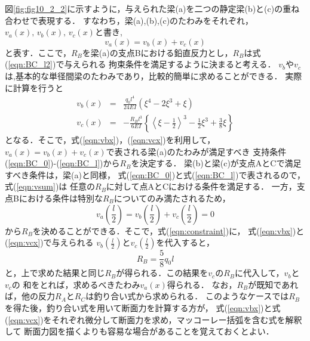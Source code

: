 \documentclass[10pt,a4j]{jbook}
\begin{document}
\begin{enumerate}
図\ref{fig:fig10_2_2}に示すように，与えられた梁(a)を二つの静定梁(b)と(c)の重ね合わせで表現する．
すなわち，梁(a),(b),(c)のたわみをそれぞれ，$v_a(x),\,v_b(x),\,v_c(x)$と書き,
\begin{equation}
	v_a(x)=v_b(x)+v_c(x)
	\label{eqn:v_sum}
\end{equation}
と表す．ここで，$R_B$を梁(a)の支点Bにおける鉛直反力とし，$R_B$は式(\ref{eqn:BC_l2})で与えられる
拘束条件を満足するように決まると考える． 
$v_b$や$v_c$は,基本的な単径間梁のたわみであり，比較的簡単に求めることができる．
実際に計算を行うと
\begin{eqnarray}
	v_b(x)&= & 
		\frac{q_0l^4}{24EI} \left( \xi^4-2\xi^3 +\xi \right)
	\label{eqn:vbx}
	\\
	v_c(x)&= & 
		-\frac{R_Bl^3}{6EI} \left\{ \left< \xi-\frac{1}{2}\right>^3 
		-\frac{1}{2}\xi^3 +\frac{3}{8}\xi \right\}
	\label{eqn:vcx}
\end{eqnarray}
となる．そこで，式(\ref{eqn:vbx})，(\ref{eqn:vcx})を利用して，
$v_a(x)=v_b(x)+v_c(x)$で表される梁(a)のたわみが満足すべき
支持条件(\ref{eqn:BC_0})-(\ref{eqn:BC_l})から$R_B$を決定する．
梁(b)と梁(c)が支点AとCで満足すべき条件は，梁(a)と同様，
式(\ref{eqn:BC_0})と式(\ref{eqn:BC_l})で表されるので，式(\ref{eqn:vsum})は
任意の$R_B$に対して点AとCにおける条件を満足する．
一方，支点Bにおける条件は特別な$R_B$についてのみ満たされるため，
\begin{equation}
	v_a\left(\frac{l}{2}\right)
	=
	v_b\left(\frac{l}{2}\right)
	+
	v_c\left(\frac{l}{2}\right)
	=0
	\label{eqn:constraint}
\end{equation}
から$R_B$を決めることができる．そこで，式(\ref{eqn:constraint})に，
式(\ref{eqn:vbx})と(\ref{eqn:vcx})で与えられる
$v_b\left(\frac{l}{2}\right)$と$v_c\left(\frac{l}{2}\right)$を代入すると，
\begin{equation}
	R_B=\frac{5}{8}q_0l
\end{equation}
と，上で求めた結果と同じ$R_B$が得られる．この結果を$v_c$の$R_B$に代入して，$v_b$と$v_c$の
和をとれば，求めるべきたわみ$v_a(x)$得られる．
なお，$R_B$が既知であれば，他の反力$R_A$と$R_C$は釣り合い式から求められる．
このようなケースでは$R_B$を得た後，釣り合い式を用いて断面力を計算する方が，
式(\ref{eqn:vbx})と式(\ref{eqn:vcx})をそれぞれ微分して断面力を求め，マッコーレー括弧を含む式を解釈して
断面力図を描くよりも容易な場合があることを覚えておくとよい．
\end{enumerate}
\end{document}
